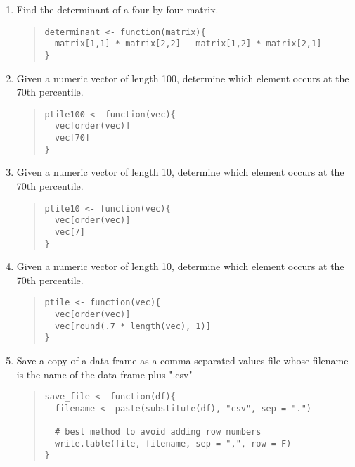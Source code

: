 \documentclass{article}
\begin{document}
\begin{enumerate}
\item Find the determinant of a four by four matrix.
  \begin{quote}
    \begin{verbatim}
determinant <- function(matrix){
  matrix[1,1] * matrix[2,2] - matrix[1,2] * matrix[2,1]
}    
    \end{verbatim}
  \end{quote}

\item Given a numeric vector of length 100, determine which element occurs at the 70th percentile.
  \begin{quote}
    \begin{verbatim}
ptile100 <- function(vec){
  vec[order(vec)]
  vec[70]
}

    \end{verbatim}
  \end{quote}

\item Given a numeric vector of length 10, determine which element occurs at the 70th percentile.
  \begin{quote}
    \begin{verbatim}
ptile10 <- function(vec){
  vec[order(vec)]
  vec[7]
}

    \end{verbatim}
  \end{quote}

\item Given a numeric vector of length 10, determine which element occurs at the 70th percentile.
  \begin{quote}
    \begin{verbatim}
ptile <- function(vec){
  vec[order(vec)]
  vec[round(.7 * length(vec), 1)]
}

    \end{verbatim}
  \end{quote}

\item Save a copy of a data frame as a comma separated values file whose filename is the name of the data frame plus ".csv"
  \begin{quote}
    \begin{verbatim}
save_file <- function(df){
  filename <- paste(substitute(df), "csv", sep = ".")

  # best method to avoid adding row numbers
  write.table(file, filename, sep = ",", row = F)
}

    \end{verbatim}
  \end{quote}


\end{enumerate}
\end{document}
